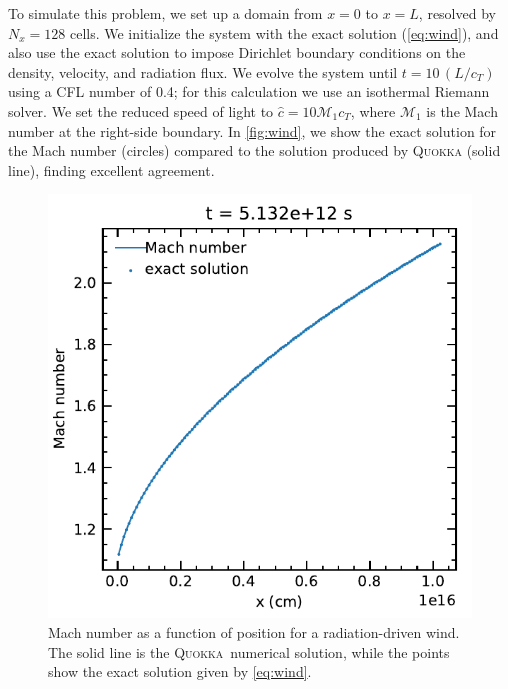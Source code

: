 \documentclass[fleqn,usenatbib]{mnras}
\newcommand{\quokka}{\textsc{Quokka}}
\begin{document}
To simulate this problem, we set up a domain from $x = 0$ to $x=L$, resolved by $N_x = 128$ cells. We initialize the system with the exact solution (\autoref{eq:wind}), and also use the exact solution to impose Dirichlet boundary conditions on the density, velocity, and radiation flux. We evolve the system until $t=10\,(L/c_T)$ using a CFL number of 0.4; for this calculation we use an isothermal Riemann solver. We set the reduced speed of light to $\hat c = 10 \mathcal{M}_1 c_T$, where $\mathcal{M}_1$ is the Mach number at the right-side boundary. In \autoref{fig:wind}, we show the exact solution for the Mach number (circles) compared to the solution produced by \textsc{Quokka} (solid line), finding excellent agreement.
\begin{figure}
    \includegraphics[width=\columnwidth]{radiation_force_tube_vel.pdf}
    \caption{Mach number as a function of position for a radiation-driven wind. The solid line is the \quokka~numerical solution, while the points show the exact solution given by \autoref{eq:wind}.}
    \label{fig:wind}
\end{figure}
\end{document}
